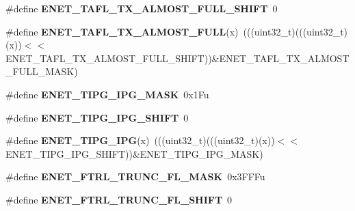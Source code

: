 \begin{DoxyCompactItemize}
\item 
\#define {\bfseries E\+N\+E\+T\+\_\+\+T\+A\+F\+L\+\_\+\+T\+X\+\_\+\+A\+L\+M\+O\+S\+T\+\_\+\+F\+U\+L\+L\+\_\+\+S\+H\+I\+FT}~0\hypertarget{group__ENET__Register__Masks_ga8667ed29a0d85d764598142ed22744c9}{}\label{group__ENET__Register__Masks_ga8667ed29a0d85d764598142ed22744c9}

\item 
\#define {\bfseries E\+N\+E\+T\+\_\+\+T\+A\+F\+L\+\_\+\+T\+X\+\_\+\+A\+L\+M\+O\+S\+T\+\_\+\+F\+U\+LL}(x)~(((uint32\+\_\+t)(((uint32\+\_\+t)(x))$<$$<$E\+N\+E\+T\+\_\+\+T\+A\+F\+L\+\_\+\+T\+X\+\_\+\+A\+L\+M\+O\+S\+T\+\_\+\+F\+U\+L\+L\+\_\+\+S\+H\+I\+FT))\&E\+N\+E\+T\+\_\+\+T\+A\+F\+L\+\_\+\+T\+X\+\_\+\+A\+L\+M\+O\+S\+T\+\_\+\+F\+U\+L\+L\+\_\+\+M\+A\+SK)\hypertarget{group__ENET__Register__Masks_gae7c579eb1b431bcaa54c840755d9dea0}{}\label{group__ENET__Register__Masks_gae7c579eb1b431bcaa54c840755d9dea0}

\item 
\#define {\bfseries E\+N\+E\+T\+\_\+\+T\+I\+P\+G\+\_\+\+I\+P\+G\+\_\+\+M\+A\+SK}~0x1\+Fu\hypertarget{group__ENET__Register__Masks_ga762834c2d579052c47b81ddf501514e1}{}\label{group__ENET__Register__Masks_ga762834c2d579052c47b81ddf501514e1}

\item 
\#define {\bfseries E\+N\+E\+T\+\_\+\+T\+I\+P\+G\+\_\+\+I\+P\+G\+\_\+\+S\+H\+I\+FT}~0\hypertarget{group__ENET__Register__Masks_gabab61fb9b318b0019d086418cc90f1f7}{}\label{group__ENET__Register__Masks_gabab61fb9b318b0019d086418cc90f1f7}

\item 
\#define {\bfseries E\+N\+E\+T\+\_\+\+T\+I\+P\+G\+\_\+\+I\+PG}(x)~(((uint32\+\_\+t)(((uint32\+\_\+t)(x))$<$$<$E\+N\+E\+T\+\_\+\+T\+I\+P\+G\+\_\+\+I\+P\+G\+\_\+\+S\+H\+I\+FT))\&E\+N\+E\+T\+\_\+\+T\+I\+P\+G\+\_\+\+I\+P\+G\+\_\+\+M\+A\+SK)\hypertarget{group__ENET__Register__Masks_ga7414200ac00eb81e47fa4f8edf6dbc68}{}\label{group__ENET__Register__Masks_ga7414200ac00eb81e47fa4f8edf6dbc68}

\item 
\#define {\bfseries E\+N\+E\+T\+\_\+\+F\+T\+R\+L\+\_\+\+T\+R\+U\+N\+C\+\_\+\+F\+L\+\_\+\+M\+A\+SK}~0x3\+F\+F\+Fu\hypertarget{group__ENET__Register__Masks_ga05457257c070632d99a2691b0859b4a9}{}\label{group__ENET__Register__Masks_ga05457257c070632d99a2691b0859b4a9}

\item 
\#define {\bfseries E\+N\+E\+T\+\_\+\+F\+T\+R\+L\+\_\+\+T\+R\+U\+N\+C\+\_\+\+F\+L\+\_\+\+S\+H\+I\+FT}~0\hypertarget{group__ENET__Register__Masks_gabde46c4ee41f8745b475d4d715455332}{}\label{group__ENET__Register__Masks_gabde46c4ee41f8745b475d4d715455332}


\end{DoxyCompactItemize}
